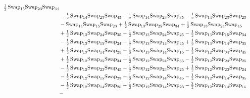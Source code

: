 \documentclass[12pt,dvipsnames,accepted=2016-08-18,a4paper,onecolumn]{quantumarticle}
\numberwithin{equation}{section}
\theoremstyle{definition}
\begin{document}
\begin{align*}
        \tfrac12\,\textnormal{Swap}_{15} \textnormal{Swap}_{23} \textnormal{Swap}_{34}\\ & - \tfrac12\,\textnormal{Swap}_{14} \textnormal{Swap}_{23} \textnormal{Swap}_{45} + \tfrac12\,\textnormal{Swap}_{14} \textnormal{Swap}_{23} \textnormal{Swap}_{35} - \tfrac12\,\textnormal{Swap}_{14} \textnormal{Swap}_{23} \textnormal{Swap}_{25}\\ & -
        \textnormal{Swap}_{14} \textnormal{Swap}_{15} \textnormal{Swap}_{23} + \tfrac12\,\textnormal{Swap}_{13} \textnormal{Swap}_{25} \textnormal{Swap}_{34} + \tfrac12\,\textnormal{Swap}_{13} \textnormal{Swap}_{24} \textnormal{Swap}_{45}\\ & + \tfrac12\,\textnormal{Swap}_{13} \textnormal{Swap}_{24} \textnormal{Swap}_{35} -
        \tfrac12\,\textnormal{Swap}_{13} \textnormal{Swap}_{24} \textnormal{Swap}_{25} - \tfrac12\,\textnormal{Swap}_{13} \textnormal{Swap}_{15} \textnormal{Swap}_{34}\\ & - \tfrac12\,\textnormal{Swap}_{13} \textnormal{Swap}_{15} \textnormal{Swap}_{24} - \tfrac12\,\textnormal{Swap}_{13} \textnormal{Swap}_{14} \textnormal{Swap}_{45} +
        \tfrac12\,\textnormal{Swap}_{13} \textnormal{Swap}_{14} \textnormal{Swap}_{35}\\ & + \tfrac12\,\textnormal{Swap}_{13} \textnormal{Swap}_{14} \textnormal{Swap}_{25} - \tfrac12\,\textnormal{Swap}_{13} \textnormal{Swap}_{14} \textnormal{Swap}_{15} - \tfrac12\,\textnormal{Swap}_{12} \textnormal{Swap}_{34} \textnormal{Swap}_{45}\\ & +
        \tfrac12\,\textnormal{Swap}_{12} \textnormal{Swap}_{25} \textnormal{Swap}_{34} + \tfrac12\,\textnormal{Swap}_{12} \textnormal{Swap}_{24} \textnormal{Swap}_{35} - \tfrac12\,\textnormal{Swap}_{12} \textnormal{Swap}_{24} \textnormal{Swap}_{25}\\ & - \tfrac12\,\textnormal{Swap}_{12} \textnormal{Swap}_{23} \textnormal{Swap}_{45} -
        \tfrac12\,\textnormal{Swap}_{12} \textnormal{Swap}_{23} \textnormal{Swap}_{25} + \tfrac12\,\textnormal{Swap}_{12} \textnormal{Swap}_{23} \textnormal{Swap}_{24}\\ & - \tfrac12\,\textnormal{Swap}_{12} \textnormal{Swap}_{15} \textnormal{Swap}_{23} - \tfrac12\,\textnormal{Swap}_{12} \textnormal{Swap}_{14} \textnormal{Swap}_{45} -
        \tfrac12\,\textnormal{Swap}_{12} \textnormal{Swap}_{14} \textnormal{Swap}_{35}\\ & - \tfrac12\,\textnormal{Swap}_{12} \textnormal{Swap}_{14} \textnormal{Swap}_{25} - \tfrac12\,\textnormal{Swap}_{12} \textnormal{Swap}_{14} \textnormal{Swap}_{23} - \tfrac32\,\textnormal{Swap}_{12} \textnormal{Swap}_{14} \textnormal{Swap}_{15}\\ & -

\end{align*}
\end{document}
